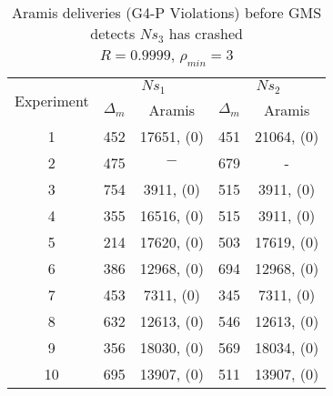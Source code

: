 \begin{table}[p]
    \begin{center}
        \renewcommand{\arraystretch}{1.25}
        \begin{tabular}{|c|c|c|c|c|}
            \hline
            \multirow{2}{*}{Experiment} & \multicolumn{2}{|c|}{$Ns_1$} & \multicolumn{2}{|c|}{$Ns_2$} \\ \cline{2-5}
                                                       & $\Delta_m$&\textsf{Aramis} & $\Delta_m$&\textsf{Aramis} \\ \hline \hline
            1 & 452 & 17651, (0) & 451 & 21064, (0) \\ \hline
            2 & 475 & $-$ & 679 & - \\ \hline
            3 & 754 & 3911, (0) & 515 & 3911, (0)  \\ \hline
            4 & 355 & 16516, (0) & 515 & 3911, (0)  \\ \hline
            5 & 214 & 17620, (0) & 503 & 17619, (0)  \\ \hline
            6 & 386 & 12968, (0) & 694 & 12968, (0)  \\ \hline
            7 & 453 & 7311, (0) & 345 & 7311, (0)  \\ \hline
            8 & 632 & 12613, (0) & 546 & 12613, (0)  \\ \hline
            9 & 356 & 18030, (0) & 569 & 18034, (0)  \\ \hline
            10 & 695 & 13907, (0) & 511 & 13907, (0)  \\ \hline
        \end{tabular}
        \caption[\textsf{Aramis} deliveries before GMS detects node crash ($R=0.9999$, $\rho_{min}=3$)]{\textsf{Aramis} deliveries (G4-P Violations) before GMS detects $Ns_3$ has crashed \\ $R=0.9999$, $\rho_{min}=3$}
        \label{table:crashed_node_rho3}
    \end{center}
\end{table}

